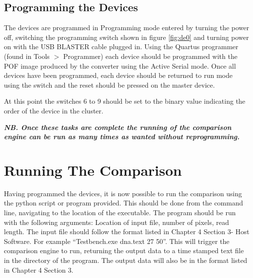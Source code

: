 \subsection{Programming the Devices}

The devices are programmed in Programming mode entered by turning the power off, switching the programming switch shown in figure \ref{fig:de0} and turning power on with the USB BLASTER cable plugged in. Using the Quartus programmer (found in Tools $>$ Programmer) each device should be programmed with the POF image produced by the converter using the Active Serial mode. Once all devices have been programmed, each device should be returned to run mode using the switch and the reset should be pressed on the master device.

At this point the switches 6 to 9 should be set to the binary value indicating the order of the device in the cluster.

\textbf{\textit{NB. Once these tasks are complete the running of the comparison engine can be run as many times as wanted without reprogramming.}}

\section{Running The Comparison}

Having programmed the devices, it is now possible to run the comparison using the python script or program provided. This should be done from the command line, navigating to the location of the executable. The program should be run with the following arguments: Location of input file, number of pixels, read length. The input file should follow the format listed in Chapter 4 Section 3- Host Software. For example ``Testbench.exe dna.text 27 50''. This will trigger the comparison engine to run, returning the output data to a time stamped text file in the directory of the program. The output data will also be in the format listed in Chapter 4 Section 3. 
